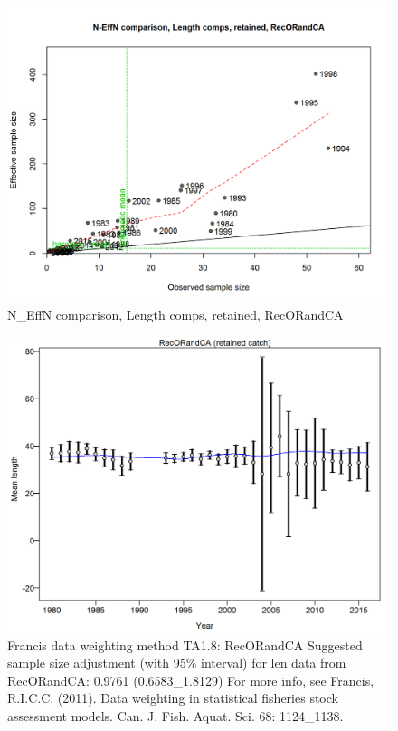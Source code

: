 \documentclass[12pt,]{article}
\begin{document}
\begin{figure}[htbp]
\centering
\includegraphics{./r4ss/plots_mod1/comp_lenfit_sampsize_flt3mkt2.png}
\caption{N\_EffN comparison, Length comps, retained, RecORandCA
\label{fig:mod1_16_comp_lenfit_sampsize_flt3mkt2}}
\end{figure}

\begin{figure}[htbp]
\centering
\includegraphics{./r4ss/plots_mod1/comp_lenfit_data_weighting_TA1.8_RecORandCA.png}
\caption{Francis data weighting method TA1.8: RecORandCA Suggested
sample size adjustment (with 95\% interval) for len data from
RecORandCA: 0.9761 (0.6583\_1.8129) For more info, see Francis, R.I.C.C.
(2011). Data weighting in statistical fisheries stock assessment models.
Can. J. Fish. Aquat. Sci. 68: 1124\_1138.
\label{fig:mod1_17_comp_lenfit_data_weighting_TA1.8_RecORandCA}}
\end{figure}
\end{document}
